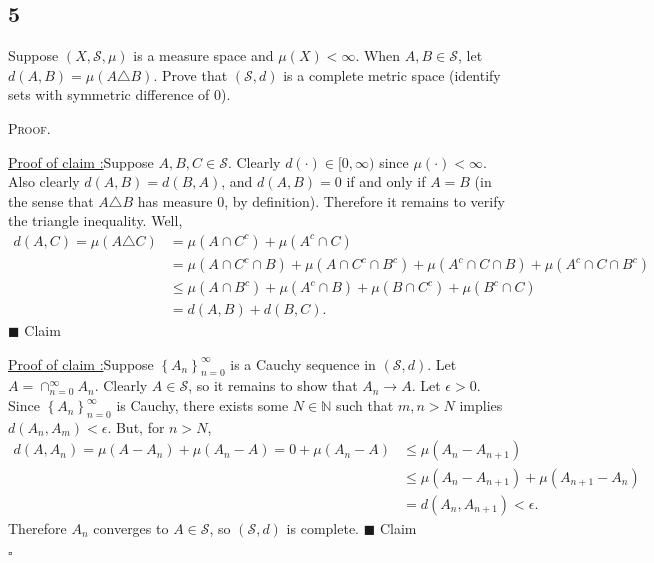 \documentclass[12pt]{article}
\newcounter{ProofCounter}
\newcounter{ClaimCounter}[ProofCounter]
\newenvironment{Proof}{\stepcounter{ProofCounter}\textsc{Proof.}}{\hfill$\square$}
\newenvironment{claim}[1]{\vspace{1mm}\stepcounter{ClaimCounter}\par\noindent\underline{\bf Claim \theClaimCounter:}\space#1}{}
\newenvironment{claimproof}[1]{\par\noindent\underline{Proof of claim \theClaimCounter:}\space#1}{\hfill $\blacksquare$ Claim \theClaimCounter}
\begin{document}
\subsection*{5}
\begin{tcolorbox}
  Suppose $(X,\mathcal{S}, \mu)$ is a measure space and $\mu(X) < \infty$. When $A,B \in \mathcal{S}$, let $d(A,B) = \mu(A\triangle B)$. Prove that 
  $(\mathcal{S}, d)$ is a complete metric space (identify sets with symmetric difference of 0).
\end{tcolorbox}
\begin{Proof}
  \begin{claimproof}
    Suppose $A,B,C \in \mathcal{S}$.
    Clearly $d(\cdot) \in [0,\infty)$ since $\mu(\cdot) < \infty$. Also clearly $d(A,B) = d(B,A)$, and $d(A,B) = 0$ if and only if $A = B$ %
    (in the sense that $A\triangle B$ has measure 0,
    by definition). Therefore it remains to verify the triangle inequality. Well,
    \begin{align*}
      d(A,C) = \mu(A\triangle C) & = \mu(A\cap C^{c}) + \mu(A^{c}\cap C) \\
      & = \mu(A\cap C^{c} \cap B) + \mu(A\cap C^{c}\cap B^{c}) + \mu(A^{c}\cap C\cap B) + \mu(A^{c}\cap C\cap B^{c}) \\
      & \leq \mu(A\cap B^{c}) + \mu(A^{c} \cap B) + \mu(B\cap C^{c}) + \mu(B^{c}\cap C) \\
      & = d(A,B) + d(B,C).
    \end{align*}
  \end{claimproof}

  \begin{claimproof}
    Suppose $\left\{ A_n \right\}_{n=0}^{\infty}$ is a Cauchy sequence in $(\mathcal{S}, d)$. Let $A = \cap_{n=0}^{\infty}A_n$. Clearly $A \in
    \mathcal{S}$, so it remains to show that $A_n \rightarrow A$. Let $\epsilon > 0$. Since $\left\{ A_n \right\}_{n=0}^{\infty}$ is Cauchy, there
    exists some $N \in \mathbb{N}$ such that $m,n > N$ implies $d(A_n, A_m) < \epsilon$. But, for $n > N$,
    \begin{align*}
      d(A,A_n) = \mu(A - A_n) + \mu(A_n - A) = 0 + \mu(A_n - A) & \leq \mu(A_n - A_{n+1}) \\
      & \leq \mu(A_n - A_{n+1}) + \mu(A_{n+1} - A_n) \\
      & = d(A_n, A_{n+1}) < \epsilon.
    \end{align*}
    Therefore $A_n$ converges to $A \in \mathcal{S}$, so $(\mathcal{S}, d)$ is complete.
  \end{claimproof}

\end{Proof}
\end{document}
